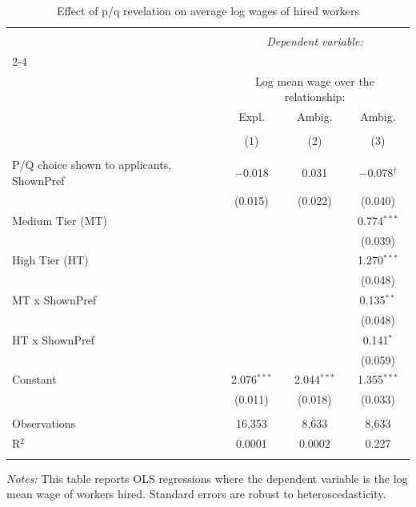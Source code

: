 
\begin{table}[!htbp] \centering 
  \caption{Effect of p/q revelation on average log wages of hired workers} 
  \label{tab:hired_rate} 
\small 
\begin{tabular}{@{\extracolsep{5pt}}lccc} 
\\[-1.8ex]\hline 
\hline \\[-1.8ex] 
 & \multicolumn{3}{c}{\textit{Dependent variable:}} \\ 
\cline{2-4} 
\\[-1.8ex] & \multicolumn{3}{c}{Log mean wage over the relationship:} \\ 
 & Expl. & Ambig. & Ambig. \\ 
\\[-1.8ex] & (1) & (2) & (3)\\ 
\hline \\[-1.8ex] 
 P/Q choice shown to applicants, ShownPref & $-$0.018 & 0.031 & $-$0.078$^{\dagger}$ \\ 
  & (0.015) & (0.022) & (0.040) \\ 
  Medium Tier (MT) &  &  & 0.774$^{***}$ \\ 
  &  &  & (0.039) \\ 
  High Tier (HT) &  &  & 1.270$^{***}$ \\ 
  &  &  & (0.048) \\ 
  MT x ShownPref &  &  & 0.135$^{**}$ \\ 
  &  &  & (0.048) \\ 
  HT x ShownPref &  &  & 0.141$^{*}$ \\ 
  &  &  & (0.059) \\ 
  Constant & 2.076$^{***}$ & 2.044$^{***}$ & 1.355$^{***}$ \\ 
  & (0.011) & (0.018) & (0.033) \\ 
 \hline \\[-1.8ex] 
Observations & 16,353 & 8,633 & 8,633 \\ 
R$^{2}$ & 0.0001 & 0.0002 & 0.227 \\ 
\hline 
\hline \\[-1.8ex] 
\end{tabular}
\begin{minipage}{0.9\textwidth} 
 \emph{Notes:} This table reports OLS regressions where the dependent variable is the log mean wage of workers hired.
Standard errors are robust to heteroscedasticity.  \starlanguage
 \end{minipage}
\end{table}
